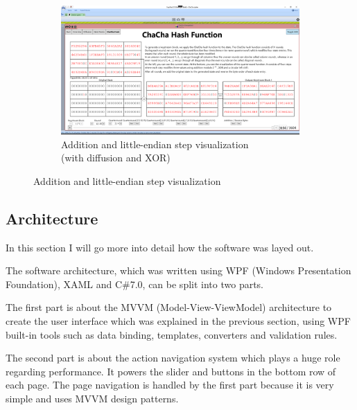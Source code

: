 \begin{figure}
\ContinuedFloat
\begin{subfigure}[t]{\textwidth}
  \centering
  \includegraphics[width=\textwidth]{figures/ct2/chachahash/chachahash-end-diffusion-xor.png}
  \caption{Addition and little-endian step visualization\\(with diffusion and XOR)}
\label{fig:chachahash.end.with.diffusion.xor}
\end{subfigure}
\caption[Addition and little-endian step visualization]{Addition and little-endian step visualization}
\label{fig:chachahash.end}
\end{figure}

\vfill

\pagebreak


\subsection{Architecture}
\label{sec:Architecture}

In this section I will go more into detail how the software was layed out.

The software architecture, which was written using WPF (Windows Presentation Foundation), XAML and C\#7.0, can be split into two parts.

The first part is about the MVVM (Model-View-ViewModel) architecture to create the user interface which was explained in the previous section, using WPF built-in tools such as data binding, templates, converters and validation rules.

The second part is about the action navigation system which plays a huge role regarding performance. It powers the slider and buttons in the bottom row of each page. The page navigation is handled by the first part because it is very simple and uses MVVM design patterns.

